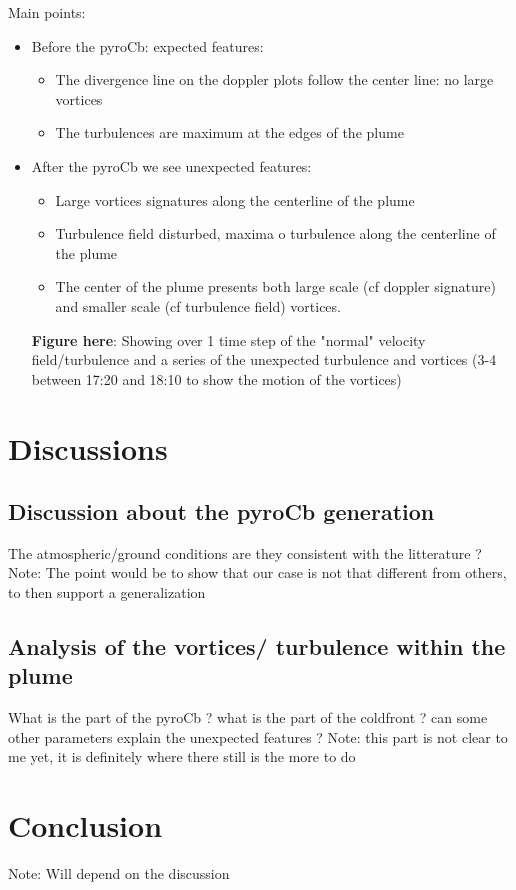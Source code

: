 \documentclass[12pt]{article}
\begin{document}
Main points:
\begin{itemize}
\item Before the pyroCb: expected features:
	\begin{itemize}
	\item The divergence line on the doppler plots follow the center line: no large vortices
	\item The turbulences are maximum at the edges of the plume 
	\end{itemize}
\item After the pyroCb we see unexpected features:
	\begin{itemize}
	\item Large vortices signatures along the centerline of the plume
	\item Turbulence field disturbed, maxima o turbulence along the centerline of the plume
	\item The center of the plume presents both large scale (cf doppler signature) and smaller scale (cf turbulence field) vortices.
	\end{itemize}
	
\textbf{Figure here}: Showing over 1 time step of  the "normal" velocity field/turbulence and a series of the unexpected turbulence and vortices (3-4 between 17:20 and 18:10 to show the motion of the vortices)
\end{itemize}
\section{Discussions}

\subsection{Discussion about the pyroCb generation}
The atmospheric/ground conditions are they consistent with the litterature ? {\color{red}Note: The point would be to show that our case is not that different from others, to then support a generalization}

\subsection{Analysis of the vortices/ turbulence within the plume}
What is the part of the pyroCb ? what is the part of the coldfront ? can some other parameters explain the unexpected features ?
{\color{red} Note: this part is not clear to me yet, it is definitely where there still is the more to do}


\section{Conclusion}
{\color{red} Note: Will depend on the discussion}
\end{document}
